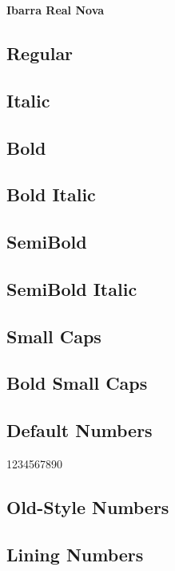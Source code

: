 \documentclass[12pt]{article}
\begin{document}
\begin{center}\Huge\bfseries
Ibarra Real Nova
\end{center}

\subsection*{Regular}
\lipsum[1]

\subsection*{Italic}
\textit{\lipsum[2]}


\subsection*{Bold}

\textbf{\lipsum[3]}

\subsection*{Bold Italic}

\textbf{\textit{\lipsum[4]}}


\subsection*{SemiBold}

{\ibarraSemiBold\lipsum[5]}

\subsection*{SemiBold Italic}

{\ibarraSemiBold\itshape\lipsum[6]}

\subsection*{Small Caps}
\textsc{\lipsum[7]}

\subsection*{Bold Small Caps}
\textsc{\textbf{\lipsum[8]}}

\subsection*{Default Numbers}

1234567890

\subsection*{Old-Style Numbers}

{}

\subsection*{Lining Numbers}

{}
\end{document}

